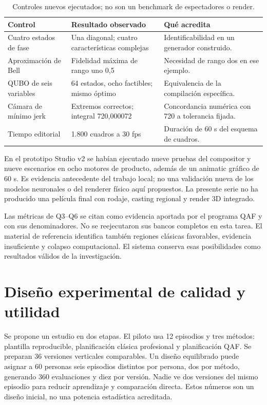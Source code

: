 \begin{table}[ht]\centering\compacttable
\begin{tabular}{p{.25\linewidth}p{.30\linewidth}p{.34\linewidth}}\toprule
Control & Resultado observado & Qué acredita \\\midrule
Cuatro estados de fase & Una diagonal; cuatro características complejas & Identificabilidad en un generador construido.\\
Aproximación de Bell & Fidelidad máxima de rango uno 0,5 & Necesidad de rango dos en ese ejemplo.\\
QUBO de seis variables & 64 estados, ocho factibles; mismo óptimo & Equivalencia de la compilación específica.\\
Cámara de mínimo jerk & Extremos correctos; integral 720,000072 & Concordancia numérica con 720 a tolerancia fijada.\\
Tiempo editorial & 1.800 cuadros a 30 fps & Duración de 60 s del esquema de cuadros.\\\bottomrule
\end{tabular}\caption{Controles nuevos ejecutados; no son un benchmark de espectadores o render.}
\end{table}

En el prototipo Studio v2 se habían ejecutado nueve pruebas del compositor y nueve escenarios en ocho motores de producto, además de un animatic gráfico de 60 s. Es evidencia antecedente del trabajo local; no una validación nueva de los modelos neuronales o del renderer físico aquí propuestos. La presente serie no ha producido una película final con rodaje, casting regional y render 3D integrado.

Las métricas de Q3--Q6 se citan como evidencia aportada por el programa QAF y con sus denominadores. No se reejecutaron sus bancos completos en esta tarea. El material de referencia identifica también regiones clásicas favorables, evidencia insuficiente y colapso computacional. El sistema conserva esas posibilidades como resultados válidos de la investigación.

\section{Diseño experimental de calidad y utilidad}
Se propone un estudio en dos etapas. El piloto usa 12 episodios y tres métodos: plantilla reproducible, planificación clásica profesional y planificación QAF. Se preparan 36 versiones verticales comparables. Un diseño equilibrado puede asignar a 60 personas seis episodios distintos por persona, dos por método, generando 360 evaluaciones y diez por versión. Nadie ve dos versiones del mismo episodio para reducir aprendizaje y comparación directa. Estos números son un diseño inicial, no una potencia estadística acreditada.

